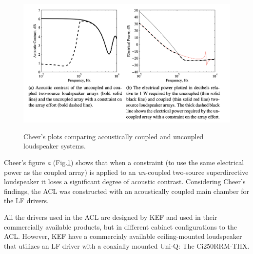 \documentclass{report}
\begin{document}
        \begin{figure}[H]
            \centering
            \includegraphics[scale=0.5]{figs/cheerGraph.png}%
            \caption{Cheer's plots comparing acoustically coupled and uncoupled loudspeaker systems.}\cite{cheer2015robustness}
            \label{cheerGraph}
        \end{figure}

        Cheer's figure \textit{a} (Fig.\ref{cheerGraph}) shows that when a constraint (to use the same electrical power as the coupled array) is applied to an \textit{un}-coupled two-source superdirective loudspeaker it loses a significant degree of acoustic contrast.
        Considering Cheer's findings, the ACL was constructed with an acoustically coupled main chamber for the LF drivers.

        All the drivers used in the ACL are designed by KEF and used in their commercially available products, but in different cabinet configurations to the ACL.
        However, KEF have a commercialy available ceiling-mounted loudspeaker that utilizes an LF driver with a coaxially mounted Uni-Q: The Ci250RRM-THX.
        
\end{document}

